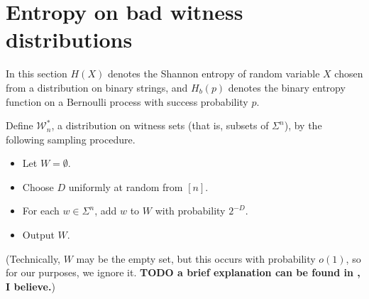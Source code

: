 \documentclass{article}
\newcommand{\todo}[1]{\textbf{TODO #1}}
\newcommand{\mc}{\mathcal}
\begin{document}
\section{Entropy on bad witness distributions}

In this section $H(X)$ denotes the Shannon entropy of random variable $X$ chosen from a distribution on binary strings, and $H_b(p)$ denotes the binary entropy function on a Bernoulli process with success probability $p$.

Define $\mc{W}_n^*$, a distribution on witness sets (that is, subsets of $\Sigma^n$), by the following sampling procedure.
\begin{itemize}
\item Let $W = \emptyset$.
\item Choose $D$ uniformly at random from $[n]$.
\item For each $w \in \Sigma^n$, add $w$ to $W$ with probability $2^{-D}$.
\item Output $W$.
\end{itemize}
(Technically, $W$ may be the empty set, but this occurs with probability $o(1)$, so for our purposes, we ignore it.
\todo{a brief explanation can be found in \autocite{krw14}, I believe.})
\end{document}
